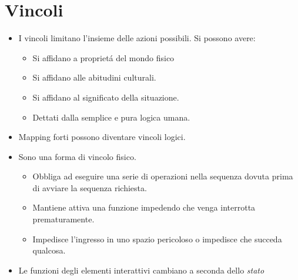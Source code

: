 \chapter{Vincoli}

\begin{itemize}
    \item I vincoli limitano l'insieme delle azioni possibili. Si possono avere:
    \begin{itemize}
        \item {} Si affidano a propriet\'a del mondo fisico
        \item {} Si affidano alle abitudini culturali.
        \item {} Si affidano al significato della situazione.
        \item {} Dettati dalla semplice e pura logica umana.
    \end{itemize}
    \item Mapping forti possono diventare vincoli logici.
    \item {} Sono una forma di vincolo fisico.
    \begin{itemize}
        \item {} Obbliga ad eseguire una serie di operazioni nella sequenza dovuta prima di avviare la sequenza richiesta.
        \item {} Mantiene attiva una funzione impedendo che venga interrotta prematuramente.
        \item {} Impedisce l'ingresso in uno spazio pericoloso o impedisce che succeda qualcosa.
    \end{itemize}
    \item {} Le funzioni degli elementi interattivi cambiano a seconda dello \textit{stato}
\end{itemize}
